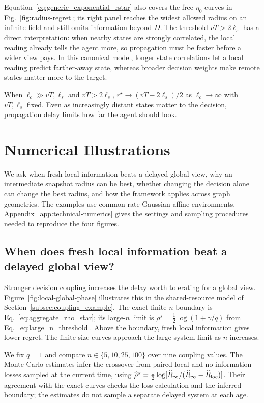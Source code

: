 \documentclass[11pt]{article}
\begin{document}
Equation~\eqref{eq:generic_exponential_rstar} also covers the free-$\eta_0$
curves in Fig.~\ref{fig:radius-regret}; its right panel reaches the widest
allowed radius on an infinite field and still omits information beyond $D$.
The threshold $vT>2\ell_s$ has a direct interpretation: when nearby states
are strongly correlated, the local reading already tells the agent more,
so propagation must be faster before a wider view pays.
In this canonical model, longer state correlations let a local reading predict
farther-away state, whereas broader decision weights make remote states
matter more to the target.

When $\ell_c\gg vT,\ell_s$ and $vT>2\ell_s$,
$r^\star\to(vT-2\ell_s)/2$ as $\ell_c\to\infty$ with $vT,\ell_s$ fixed.
Even as increasingly distant states matter to the decision, propagation
delay limits how far the agent should look.

\section{Numerical Illustrations}
\label{sec:numerical-evaluation}

We ask when fresh local information beats a delayed global view, why an
intermediate snapshot radius can be best, whether changing the decision alone
can change the best radius, and how the framework applies across graph geometries. The
examples use common-rate Gaussian-affine environments.
Appendix~\ref{app:technical-numerics} gives the settings and sampling
procedures needed to reproduce the four figures.

\subsection{When does fresh local information beat a delayed global view?}
\label{subsec:numerical-temporal-crossover}

Stronger decision coupling increases the delay worth tolerating for a global
view. Figure~\ref{fig:local-global-phase} illustrates this in the
shared-resource model of Section~\ref{subsec:coupling_example}.
The exact finite-$n$ boundary is Eq.~\eqref{eq:aggregate_rho_star}; its
large-$n$ limit is $\rho^\star=\tfrac12\log(1+\gamma/q)$
from Eq.~\eqref{eq:large_n_threshold}. Above the boundary, fresh local
information gives lower regret. The finite-size curves approach the
large-system limit as $n$ increases.

We fix $q=1$ and compare $n\in\{5,10,25,100\}$ over nine coupling values.
The Monte Carlo estimates infer the crossover from paired local and
no-information losses sampled at the current time, using
$\widehat\rho^\star=\tfrac12\log[\widehat R_\infty/
(\widehat R_\infty-\widehat R_{\rm loc})]$.
Their agreement with the exact curves checks the loss calculation and the
inferred boundary; the estimates do not sample a separate delayed system
at each age.
\end{document}
